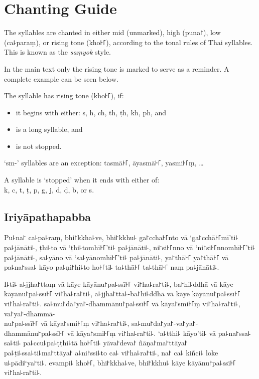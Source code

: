 \cleartorecto
\chapter{Chanting Guide}

The syllables are chanted in either mid (unmarked), high (puna꜓), low
(ca꜕paraṃ), or rising tone (kho꜔꜒), according to the tonal rules of Thai
syllables. This is known as the \emph{saṃyok} style.

In the main text only the rising tone is marked to serve as a reminder. A
complete example can be seen below.

The syllable has rising tone (kho꜔꜒), if:

\begin{itemize}[itemsep=0pt, parsep=0pt, topsep=0pt]
  \item it begins with either: s, h, ch, th, ṭh, kh, ph, and
  \item is a long syllable, and
  \item is not stopped.
\end{itemize}

`sm-' syllables are an exception: tasmā꜔꜒, āyasmā꜔꜒, yasmi꜔꜒ṃ, \ldots{}

A syllable is `stopped' when it ends with either of:\\
k, c, t, ṭ, p, g, j, d, ḍ, b, or s.

\enlargethispage{2\baselineskip}

\section*{Iriyāpathapabba}

Pu꜕na꜓ ca꜕pa꜕raṃ, bhi꜓kkha꜕ve, bhi꜓kkhu꜕ ga꜓ccha꜔꜒nto vā ‘ga꜓cchā꜔꜒mī’ti꜕ pa꜕jānāti꜕, ṭhi꜕to vā
‘ṭhi꜕tomhī꜔꜒’ti꜕ pa꜕jānāti꜕, ni꜓si꜔꜒nno vā ‘ni꜓si꜔꜒nnomhī꜔꜒’ti꜕ pa꜕jānāti꜕, sa꜕yāno vā
‘sa꜕yānomhī꜔꜒’ti꜕ pa꜕jānāti꜕, ya꜓thā꜔꜒ ya꜓thā꜔꜒ vā pa꜕na꜓ssa꜕ kāyo pa꜕ṇi꜓hi꜕to ho꜔꜒ti꜕ ta꜕thā꜔꜒ ta꜕thā꜔꜒
naṃ pa꜕jānāti꜕.

I꜕ti꜕ a꜕jjha꜓ttaṃ vā kāye kāyānu꜓pa꜕ssī꜔꜒ vi꜓ha꜕ra꜓ti꜕, ba꜓hi꜕ddhā vā kāye kāyānu꜓pa꜕ssī꜔꜒
vi꜓ha꜕ra꜓ti꜕, a꜕jjha꜓tta꜕-ba꜓hi꜕ddhā vā kāye kāyānu꜓pa꜕ssī꜔꜒ vi꜓ha꜕ra꜓ti꜕. sa꜕mu꜓da꜓ya꜓-dhammānu꜓pa꜕ssī꜔꜒
vā kāya꜓smi꜔꜒ṃ vi꜓ha꜕ra꜓ti꜕, va꜓ya꜓-dhammā-\\
nu꜓pa꜕ssī꜔꜒ vā kāya꜓smi꜔꜒ṃ vi꜓ha꜕ra꜓ti꜕, sa꜕mu꜓da꜓ya꜓-va꜓ya꜓-dhammānu꜓pa꜕ssī꜔꜒ vā kāya꜓smi꜔꜒ṃ vi꜓ha꜕ra꜓ti꜕.
‘a꜕tthi꜕ kāyo’ti꜕ vā pa꜕na꜓ssa꜕ sa꜕ti꜕ pa꜕ccu꜕pa꜕ṭṭhi꜕tā ho꜔꜒ti꜕ yāva꜓deva꜓ ñāṇa꜓ma꜓ttāya꜓
pa꜕ṭi꜕ssa꜕ti꜕ma꜓ttāya꜓ a꜕ni꜓ssi꜕to ca꜕ vi꜓ha꜕ra꜓ti꜕, na꜓ ca꜕ kiñci꜕ loke u꜕pādi꜓ya꜓ti꜕. evampi꜕ kho꜔꜒,
bhi꜓kkha꜕ve, bhi꜓kkhu꜕ kāye kāyānu꜓pa꜕ssī꜔꜒ vi꜓ha꜕ra꜓ti꜕.
